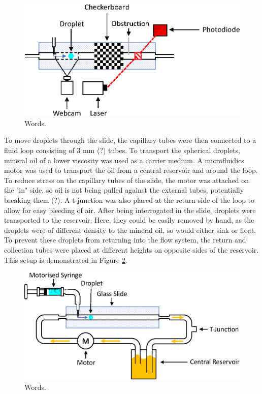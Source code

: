 \documentclass{physics_article_B}
\begin{document}
            \begin{figure}[H]
            \centering
            \hspace*{2cm}\includegraphics[scale=0.9]{Figures/Control.eps}
            \captionsetup{justification=centering}
            \caption{Words.} 	
            \label{fig:control}
            \end{figure} 
    
        To move droplets through the slide, the capillary tubes were then connected to a fluid loop consisting of 3 mm (?) tubes. To transport the spherical droplets, mineral oil of a lower viscosity was used as a carrier medium. A microfluidics motor was used to transport the oil from a central reservoir and around the loop. To reduce stress on the capillary tubes of the slide, the motor was attached on the "in" side, so oil is not being pulled against the external tubes, potentially breaking them (?). A t-junction was also placed at the return side of the loop to allow for easy bleeding of air. After being interrogated in the slide, droplets were transported to the reservoir. Here, they could be easily removed by hand, as the droplets were of different density to the mineral oil, so would either sink or float. To prevent these droplets from returning into the flow system, the return and collection tubes were placed at different heights on opposite sides of the reservoir. This setup is demonstrated in Figure \ref{fig:basic}.
        
            \begin{figure}[H]
            \centering
            \hspace*{2.0cm}\includegraphics[scale=0.8]{Figures/Fluid.eps}
            \captionsetup{justification=centering}
            \caption{Words.} 	
            \label{fig:basic}
            \end{figure} 
\end{document}
